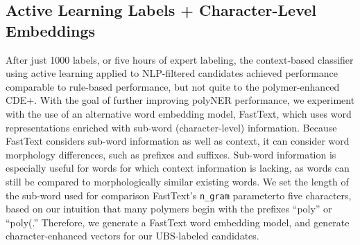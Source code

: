 \subsection{Active Learning Labels + Character-Level Embeddings}
After just 1000 labels, or five hours of expert labeling, the context-based classifier using active learning applied to NLP-filtered candidates achieved performance comparable to rule-based performance, 
but not quite to the polymer-enhanced CDE+.
With the goal of further improving polyNER performance,
we experiment with the use of an alternative word embedding model, FastText, which 
uses word representations enriched with sub-word (character-level) information.
Because FastText considers sub-word information as well as
context, it can consider word morphology differences, such as prefixes
and suffixes. Sub-word information is especially useful for words for which
context information is lacking, as words can still be compared to morphologically similar
existing words. We set the length of the sub-word used for comparison\textemdash
FastText's \texttt{n_gram} parameter\textemdash to five characters, based on our intuition that
many polymers begin with the prefixes ``poly'' or ``poly(.'' 
Therefore, we generate a FastText word embedding model, 
and generate character-enhanced vectors for our UBS-labeled candidates.


